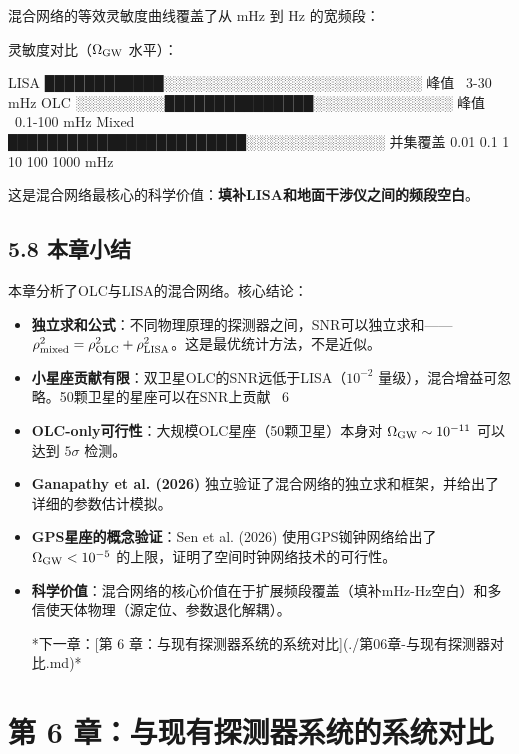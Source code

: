 \documentclass[12pt,a4paper]{article}
\begin{document}
混合网络的等效灵敏度曲线覆盖了从 mHz 到 Hz 的宽频段：

灵敏度对比（$\Omega_{\rm GW}$ 水平）：

LISA    ████████████░░░░░░░░░░░░░░░░░░░░░░░░░░ 峰值 ~3-30 mHz
OLC     ░░░░░░░░░███████████████░░░░░░░░░░░░░░ 峰值 ~0.1-100 mHz
Mixed   ████████████████████████░░░░░░░░░░░░░░ 并集覆盖
0.01     0.1     1      10     100    1000 mHz

这是混合网络最核心的科学价值：\textbf{填补LISA和地面干涉仪之间的频段空白}。

\subsection{5.8 本章小结}


本章分析了OLC与LISA的混合网络。核心结论：

\begin{itemize}
  \item[1] \textbf{独立求和公式}：不同物理原理的探测器之间，SNR可以独立求和——$\rho_{\rm mixed}^2 = \rho_{\rm OLC}^2 + \rho_{\rm LISA}^2$。这是最优统计方法，不是近似。

  \item[2] \textbf{小星座贡献有限}：双卫星OLC的SNR远低于LISA（$10^{-2}$ 量级），混合增益可忽略。50颗卫星的星座可以在SNR上贡献 ~6%

  \item[3] \textbf{OLC-only可行性}：大规模OLC星座（50颗卫星）本身对 $\Omega_{\rm GW} \sim 10^{-11}$ 可以达到 $5\sigma$ 检测。

  \item[4] \textbf{Ganapathy et al. (2026)} 独立验证了混合网络的独立求和框架，并给出了详细的参数估计模拟。

  \item[5] \textbf{GPS星座的概念验证}：Sen et al. (2026) 使用GPS铷钟网络给出了 $\Omega_{\rm GW} < 10^{-5}$ 的上限，证明了空间时钟网络技术的可行性。

  \item[6] \textbf{科学价值}：混合网络的核心价值在于扩展频段覆盖（填补mHz-Hz空白）和多信使天体物理（源定位、参数退化解耦）。


*下一章：[第 6 章：与现有探测器系统的系统对比](./第06章-与现有探测器对比.md)*

\end{itemize}
\section{第 6 章：与现有探测器系统的系统对比}
\end{document}
